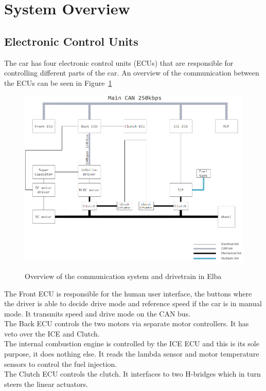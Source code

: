 \section{System Overview}
\subsection{Electronic Control Units}
The car has four electronic control units (ECUs) that are responsible for
controlling different parts of the car. An overview of the communication between
the ECUs can be seen in Figure~\ref{fig:communication_overview}
\begin{figure}[H]
    \centering\label{fig:communication_overview}
    \includegraphics[width=1\textwidth]{./img/elba_communication_overview}
    \caption{Overview of the communication system and drivetrain in Elba}
\end{figure}
The Front ECU is responsible for the human user interface, the buttons where the
driver is able to decide drive mode and reference speed if the car is in manual
mode. It transmits speed and drive mode on the CAN bus.\\
The Back ECU controls the two motors via separate motor controllers. It has
veto over the ICE and Clutch.\\
The internal combustion engine is controlled by the ICE ECU and this is its sole
purpose, it does nothing else. It reads the lambda sensor and motor
temperature sensors to control the fuel injection.\\
The Clutch ECU controls the clutch. It interfaces to two H-bridges which in turn
steers the linear actuators.  

